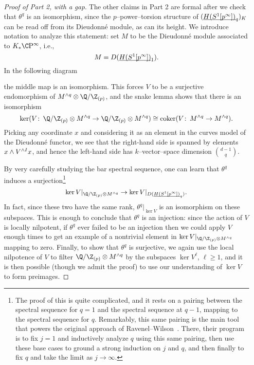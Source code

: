 \begin{proof}[Proof of Part 2, with a gap]\renewcommand{\qedsymbol}{\relax}
The other claims in Part 2 are formal after we check that $\theta^q$ is an isomorphism, since the $p$--power--torsion structure of $(\underline{\smash{H(S^1[p^\infty])}}_{q})_K$ can be read off from its Dieudonn\'e module, as can its height.  We introduce notation to analyze this statement: set $M$ to be the Dieudonn\'e module associated to $K_* \CP^\infty$, i.e., \[M = D(\underline{\smash{H(S^1[p^\infty])}}_{1}).\]  In the following diagram
\begin{center}
\end{center}
the middle map is an isomorphism.  This forces $V$ to be a surjective endomorphism of $M^{\wedge q} \otimes \Q/\Z_{(p)}$, and the snake lemma shows that there is an isomorphism \[\ker(V\co \Q/\Z_{(p)} \otimes M^{\wedge q} \to \Q/\Z_{(p)} \otimes M^{\wedge q}) \cong \operatorname{coker}(V\co M^{\wedge q} \to M^{\wedge q}).\]  Picking any coordinate $x$ and considering it as an element in the curves model of the Dieudonn\'e functor, we see that the right-hand side is spanned by elements $x \wedge V^{\wedge I} x$, and hence the left-hand side has $k$--vector--space dimension $\binom{d-1}{q}$.

By very carefully studying the bar spectral sequence, one can learn that $\theta^q$ induces a surjection\footnote{The proof of this is quite complicated, and it rests on a pairing between the spectral sequence for $q = 1$ and the spectral sequence at $q - 1$, mapping to the spectral sequence for $q$.  Remarkably, this same pairing is the main tool that powers the original approach of  Ravenel--Wilson~\cite{RavenelWilsonKthyOfEMSpaces}.  There, their program is to fix $j = 1$ and inductively analyze $q$ using this same pairing, then use these base cases to ground a strong induction on $j$ and $q$, and then finally to fix $q$ and take the limit as $j \to \infty$.} \[\ker V|_{\Q / \Z_{(p)} \otimes M^{\wedge q}} \to \ker V|_{D(\OS{H(S^1[p^\infty])}{q})}.\]  In fact, since these two have the same rank, $\theta^q|_{\ker V}$ is an isomorphism on these subspaces.  This is enough to conclude that $\theta^q$ is an injection: since the action of $V$ is locally nilpotent, if $\theta^q$ ever failed to be an injection then we could apply $V$ enough times to get an example of a nontrivial element in $\ker V|_{\Q / \Z_{(p)} \otimes M^{\wedge q}}$ mapping to zero.  Finally, to show that $\theta^q$ is surjective, we again use the local nilpotence of $V$ to filter $\Q / \Z_{(p)} \otimes M^{\sm q}$ by the subspaces $\ker V^\ell$, $\ell \ge 1$, and it is then possible (though we admit the proof) to use our understanding of $\ker V$ to form preimages.
\end{proof}

